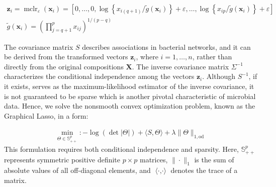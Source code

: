 \documentclass[10pt,a4paper]{article}
\begin{document}
\begin{equation}
    \begin{gathered}
        \mathbf{z}_i = \operatorname{mclr}_{\varepsilon}(\mathbf{x}_i)
        = \left[0, \ldots, 0, \log\left\{x_{i(q+1)} / \widetilde{g}(\mathbf{x}_i)\right\}+\varepsilon, \ldots, \log\left\{x_{i p} / \widetilde{g}(\mathbf{x}_i)\right\}+\varepsilon\right] \\
        \widetilde{g}(\mathbf{x}_i) = \left(\prod_{j=q+1}^p x_{i j}\right)^{1/(p-q)}
    \end{gathered}
\end{equation}

The covariance matrix \(S\) describes associations in bacterial networks, and it can be derived from the transformed vectors \(\mathbf{z}_i\), where \(i = 1, \ldots, n\), rather than directly from the original compositions \(\mathbf{X}\). The inverse covariance matrix \(\Sigma^{-1}\) characterizes the conditional independence among the vectors \(\mathbf{z}_i\). Although \(S^{-1}\), if it exists, serves as the maximum-likelihood estimator of the inverse covariance, it is not guaranteed to be sparse which is another pivotal characteristic of microbial data. Hence, we solve the nonsmooth convex optimization problem, known as the Graphical Lasso, in a form:

\begin{equation}
    \begin{gathered}
        \min_{\Theta \in \mathbb{S}^p_{++}}:-\log (\operatorname{det}|\Theta|)+\langle S, \Theta\rangle+\lambda\|\Theta\|_{1, \text{od}}
    \end{gathered}
\end{equation}
This formulation requires both conditional independence and sparsity. Here, \(\mathbb{S}^p_{++}\) represents symmetric positive definite  \(p \times p\) matrices, \(\|\cdot\|_1\) is the sum of absolute values of all off-diagonal elements, and \(\operatorname{\langle \cdot, \cdot \rangle}\) denotes the trace of a matrix.




\end{document}
